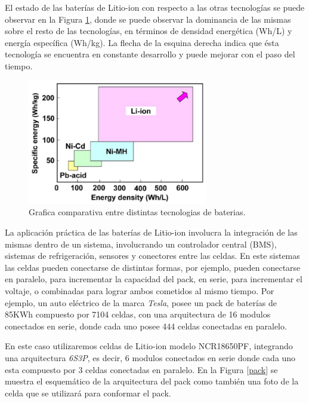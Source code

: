 \documentclass[10pt,a4paper]{article}
\begin{document}
	\noindent El estado de las baterías de Litio-ion con respecto a las otras 
    tecnologías se puede observar en la Figura \ref{comparisson_batt}, donde se 
    puede observar la dominancia de las mismas sobre el resto de las 
    tecnologías, en términos de densidad energética (Wh/L) y energía específica 
    (Wh/kg). La flecha de la esquina derecha indica que ésta tecnología se 
    encuentra en constante desarrollo y puede mejorar con el paso del tiempo.

    \begin{figure}[h!]
        \begin{center}
            \includegraphics[width=0.7\textwidth]{comparisson-liion.png}
            \caption{Grafica comparativa entre distintas
            tecnologias de baterias.}
            \label{comparisson_batt}
        \end{center}
    \end{figure}

	\noindent La aplicación práctica de las baterías de Litio-ion involucra la 
    integración de las mismas dentro de un sistema, involucrando un controlador 
    central (BMS), sistemas de refrigeración, sensores y conectores entre las 
    celdas. En este sistemas las celdas pueden conectarse de distintas 
    formas, por ejemplo, pueden conectarse en paralelo, para incrementar la 
    capacidad del pack, en serie, para incrementar el voltaje, o combinadas 
    para lograr ambos cometidos al mismo tiempo. Por ejemplo, un auto eléctrico 
    de la marca \emph{Tesla}, posee un pack de baterías de 85KWh compuesto por 
    7104 celdas, con una arquitectura de 16 modulos conectados en serie, 
    donde cada uno posee 444 celdas conectadas en paralelo.

    \clearpage

	\noindent En este caso utilizaremos celdas de Litio-ion modelo NCR18650PF, 
    integrando una arquitectura \emph{6S3P}, es decir, 6 modulos conectados en 
    serie donde cada uno esta compuesto por 3 celdas conectadas en paralelo. 
    En la Figura \ref{pack} se muestra el esquemático de la arquitectura del 
    pack como también una foto de la celda que se utilizará para conformar el 
    pack. 
	
\end{document}
